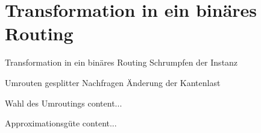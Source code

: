 \documentclass[8pt]{beamer}
\theoremstyle{claim}
\begin{document}
	\section{Transformation in ein binäres Routing}
	\begin{frame}{Transformation in ein binäres Routing}
		Schrumpfen der Instanz
	\end{frame}

	\begin{frame}{Umrouten gesplitter Nachfragen}
		Änderung der Kantenlast
	\end{frame}

	\begin{frame}{Wahl des Umroutings}
		content...
	\end{frame}
	
	\begin{frame}{Approximationsgüte}
		content...
	\end{frame}
	
	\begin{frame}[allowframebreaks]
		\nocite{schrijver99, karp72}
		
	\end{frame}
\end{document}
